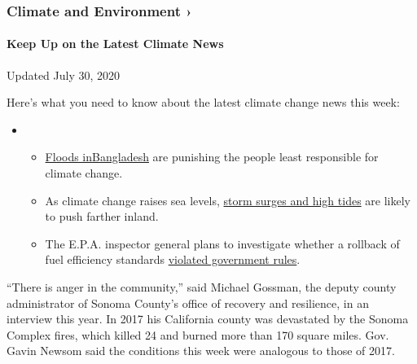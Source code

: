 \href{https://www.nytimes.com/section/climate?action=click\&pgtype=Article\&state=default\&region=MAIN_CONTENT_1\&context=storylines_keepup}{}

\hypertarget{climate-and-environment-}{%
\subsubsection{Climate and Environment
›}\label{climate-and-environment-}}

\hypertarget{keep-up-on-the-latest-climate-news}{%
\paragraph{Keep Up on the Latest Climate
News}\label{keep-up-on-the-latest-climate-news}}

Updated July 30, 2020

Here's what you need to know about the latest climate change news this
week:

\begin{itemize}
\item
  \begin{itemize}
  \tightlist
  \item
    \href{https://www.nytimes.com/2020/07/30/climate/bangladesh-floods.html?action=click\&pgtype=Article\&state=default\&region=MAIN_CONTENT_1\&context=storylines_keepup}{Floods
    in}\href{https://www.nytimes.com/2020/07/30/climate/bangladesh-floods.html?action=click\&pgtype=Article\&state=default\&region=MAIN_CONTENT_1\&context=storylines_keepup}{Bangladesh}
    are punishing the people least responsible for climate change.
  \item
    As climate change raises sea levels,
    \href{https://www.nytimes.com/2020/07/30/climate/sea-level-inland-floods.html?action=click\&pgtype=Article\&state=default\&region=MAIN_CONTENT_1\&context=storylines_keepup}{storm
    surges and high tides} are likely to push farther inland.
  \item
    The E.P.A. inspector general plans to investigate whether a rollback
    of fuel efficiency standards
    \href{https://www.nytimes.com/2020/07/27/climate/trump-fuel-efficiency-rule.html?action=click\&pgtype=Article\&state=default\&region=MAIN_CONTENT_1\&context=storylines_keepup}{violated
    government rules}.
  \end{itemize}
\end{itemize}

``There is anger in the community,'' said Michael Gossman, the deputy
county administrator of Sonoma County's office of recovery and
resilience, in an interview this year. In 2017 his California county was
devastated by the Sonoma Complex fires, which killed 24 and burned more
than 170 square miles. Gov. Gavin Newsom said the conditions this week
were analogous to those of 2017.


